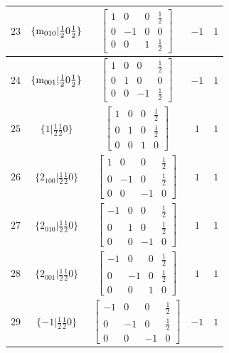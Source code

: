 \documentclass[fleqn,8pt]{jsarticle}
\begin{document}
\begin{longtable}{ccccc}
$ 23 $ & $ \{{\rm m}_{010}|\frac{1}{2} 0 \frac{1}{2}\} $ & $ \begin{bmatrix} 1 & 0 & 0 & \frac{1}{2} \\ 0 & -1 & 0 & 0 \\ 0 & 0 & 1 & \frac{1}{2} \end{bmatrix} $ & $ -1 $ & $ 1 $ \\ \hline
$ 24 $ & $ \{{\rm m}_{001}|\frac{1}{2} 0 \frac{1}{2}\} $ & $ \begin{bmatrix} 1 & 0 & 0 & \frac{1}{2} \\ 0 & 1 & 0 & 0 \\ 0 & 0 & -1 & \frac{1}{2} \end{bmatrix} $ & $ -1 $ & $ 1 $ \\ \hline
$ 25 $ & $ \{1|\frac{1}{2} \frac{1}{2} 0\} $ & $ \begin{bmatrix} 1 & 0 & 0 & \frac{1}{2} \\ 0 & 1 & 0 & \frac{1}{2} \\ 0 & 0 & 1 & 0 \end{bmatrix} $ & $ 1 $ & $ 1 $ \\ \hline
$ 26 $ & $ \{2{}_{100}|\frac{1}{2} \frac{1}{2} 0\} $ & $ \begin{bmatrix} 1 & 0 & 0 & \frac{1}{2} \\ 0 & -1 & 0 & \frac{1}{2} \\ 0 & 0 & -1 & 0 \end{bmatrix} $ & $ 1 $ & $ 1 $ \\ \hline
$ 27 $ & $ \{2{}_{010}|\frac{1}{2} \frac{1}{2} 0\} $ & $ \begin{bmatrix} -1 & 0 & 0 & \frac{1}{2} \\ 0 & 1 & 0 & \frac{1}{2} \\ 0 & 0 & -1 & 0 \end{bmatrix} $ & $ 1 $ & $ 1 $ \\ \hline
$ 28 $ & $ \{2{}_{001}|\frac{1}{2} \frac{1}{2} 0\} $ & $ \begin{bmatrix} -1 & 0 & 0 & \frac{1}{2} \\ 0 & -1 & 0 & \frac{1}{2} \\ 0 & 0 & 1 & 0 \end{bmatrix} $ & $ 1 $ & $ 1 $ \\ \hline
$ 29 $ & $ \{-1|\frac{1}{2} \frac{1}{2} 0\} $ & $ \begin{bmatrix} -1 & 0 & 0 & \frac{1}{2} \\ 0 & -1 & 0 & \frac{1}{2} \\ 0 & 0 & -1 & 0 \end{bmatrix} $ & $ -1 $ & $ 1 $ \\ \hline

\end{longtable}
\end{document}

